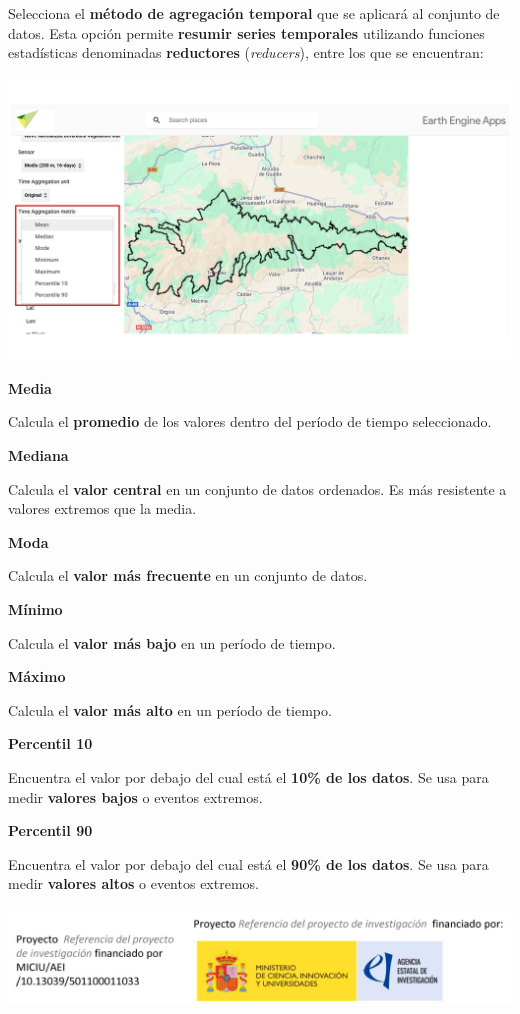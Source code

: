 \documentclass[
]{book}
\begin{document}
Selecciona el \textbf{método de agregación temporal} que se aplicará al conjunto de datos. Esta opción permite \textbf{resumir series temporales} utilizando funciones estadísticas denominadas \textbf{reductores} (\emph{reducers}), entre los que se encuentran:

\includegraphics{assets/aggregationTime.png}

\textbf{Media}

Calcula el \textbf{promedio} de los valores dentro del período de tiempo seleccionado.

\textbf{Mediana}

Calcula el \textbf{valor central} en un conjunto de datos ordenados. Es más resistente a valores extremos que la media.

\textbf{Moda}

Calcula el \textbf{valor más frecuente} en un conjunto de datos.

\textbf{Mínimo}

Calcula el \textbf{valor más bajo} en un período de tiempo.

\textbf{Máximo}

Calcula el \textbf{valor más alto} en un período de tiempo.

\textbf{Percentil 10}

Encuentra el valor por debajo del cual está el \textbf{10\% de los datos}. Se usa para medir \textbf{valores bajos} o eventos extremos.

\textbf{Percentil 90}

Encuentra el valor por debajo del cual está el \textbf{90\% de los datos}. Se usa para medir \textbf{valores altos} o eventos extremos.

\includegraphics{assets/logo.jpeg}
\end{document}
